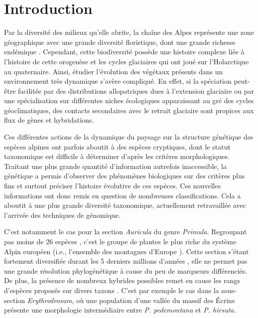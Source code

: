\section{Introduction}

Par la diversité des milieux qu'elle abrite, la chaîne des Alpes représente une zone géographique avec une grande diversité floristique, dont une grande richesse endémique \citep{Ozenda1995}. Cependant, cette biodiversité possède une histoire complexe liée à l'histoire de cette orogenèse et les cycles glaciaires qui ont joué sur l'Holarctique au quaternaire. Ainsi, étudier l'évolution des végétaux présents dans un environnement très dynamique s'avère compliqué. En effet, si la spéciation peut-être facilitée par des distributions allopatriques dues à l’extension glaciaire ou par une spécialisation sur différentes niches écologiques apparaissant au gré des cycles géoclimatiques, des contacts secondaires avec le retrait glaciaire sont propices aux flux de gènes et hybridations. 

Ces différentes actions de la dynamique du paysage sur la structure génétique des espèces alpines ont parfois aboutit à des espèces cryptiques, dont le statut taxonomique est difficile à déterminer d'après les critères morphologiques. Traitant une plus grande quantité d'information autrefois inaccessible, la génétique a permis d'observer des phénomènes biologiques sur des critères plus fins et surtout préciser l'histoire évolutive de ces espèces. Ces nouvelles informations ont donc remis en question de nombreuses classifications. Cela a aboutit à une plus grande diversité taxonomique, actuellement retravaillée avec l'arrivée des techniques de génomique. 


C'est notamment le cas pour la section \textit{Auricula} du genre \textit{Primula}. Regroupant pas moins de 26 espèces \citep{Zhang2004}, c'est le groupe de plantes le plus riche du système Alpin européen (i.e., l'ensemble des montagnes d'Europe \citep{Ozenda1995}). Cette section s'étant fortement diversifiée durant les 5 derniers millions d'années \citep{Zhang2004a,Boucher2016}, elle ne permet pas une grande résolution phylogénétique à cause du peu de marqueurs différenciés. De plus, la présence de nombreux hybrides possibles remet en cause les rangs d'espèces proposés sur divers taxons \citep{Kadereit2011}. C'est par exemple le cas dans la sous-section \textit{Erythrodrosum}, où une population d'une vallée du massif des Écrins présente une morphologie intermédiaire entre \textit{P. pedemontana} et \textit{P. hirsuta}. 

